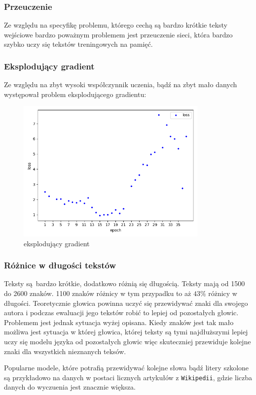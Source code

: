 \subsubsection{Przeuczenie}
Ze względu na specyfikę problemu, którego cechą są bardzo krótkie teksty wejściowe bardzo poważnym 
problemem jest przeuczenie sieci, która bardzo szybko uczy się tekstów treningowych na pamięć. 

\subsubsection{Eksplodujący gradient}
Ze względu na zbyt wysoki współczynnik uczenia, bądź na zbyt mało danych występował problem eksplodującego
gradientu:
\begin{figure}[H]
	\centering
	\includegraphics[height=7cm]{./images/exploading_gradient.png}
	\caption{eksplodujący gradient}
	\label{fig:test5}
\end{figure}

\subsubsection{Różnice w długości tekstów}
Teksty są bardzo krótkie, dodatkowo różnią się długością. Teksty mają od 1500 do 2600 znaków. 1100 znaków 
różnicy w tym przypadku to aż $43\%$ różnicy w długości. Teoretycznie głowica powinna uczyć się przewidywać znaki dla 
swojego autora i podczas ewaluacji jego tekstów robić to lepiej od pozostałych głowic. Problemem jest
 jednak sytuacja wyżej opisana. Kiedy znaków jest tak mało 
możliwa jest sytuacja w której głowica, której teksty są tymi najdłuższymi lepiej uczy się modelu języka od
pozostałych głowic więc skuteczniej przewiduje kolejne znaki dla wszystkich nieznanych teksów.

Popularne modele, które potrafią przewidywać kolejne słowa bądź litery szkolone są przykładowo na danych w postaci licznych 
artykułów z \texttt{Wikipedii}, gdzie liczba danych do wyczuenia jest znacznie większa.

